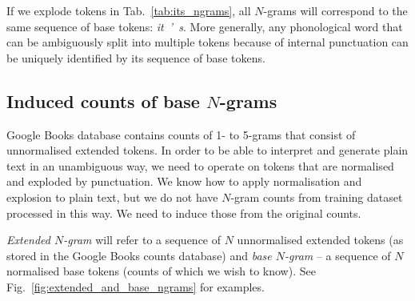 \documentclass{IIBproject}
\begin{document}
If we explode tokens in Tab.~\ref{tab:its_ngrams}, all $N$-grams will correspond to the same sequence of base tokens: \emph{it\ '\ s}. More generally, any phonological word that can be ambiguously split into multiple tokens because of internal punctuation can be uniquely identified by its sequence of base tokens.

\subsection{Induced counts of base $N$-grams}

Google Books database contains counts of 1- to 5-grams that consist of unnormalised extended tokens. In order to be able to interpret and generate plain text in an unambiguous way, we need to operate on tokens that are normalised and exploded by punctuation. We know how to apply normalisation and explosion to plain text, but we do not have $N$-gram counts from training dataset processed in this way. We need to induce those from the original counts.

\emph{Extended $N$-gram} will refer to a sequence of $N$ unnormalised extended tokens (as stored in the Google Books counts database) and \emph{base $N$-gram} -- a sequence of $N$ normalised base tokens (counts of which we wish to know). See Fig.~\ref{fig:extended_and_base_ngrams} for examples.

%
\newcommand{\ngramMark}[3] {
	\filldraw (#1,#3) circle (3pt);
	\draw (#1,#3)--(#2,#3);
	\filldraw (#2,#3) circle (3pt);
}

%
\newcommand{\extendedTokenDelimiter}[1] {
	\draw (#1,-19)--(#1,14.5);
}

%
\newcommand{\baseTokenDelimiter}[1] {
	\draw [dotted] (#1,-19)--(#1,14.5);
}

%
\newcommand{\ngramsLabel}[3] {
	\draw [decorate,decoration={brace,amplitude=2.5pt,raise=2.5pt}] (-1,#1) -- (-1,#2) node [midway,left,xshift=-5pt] {#3};
}
\end{document}

